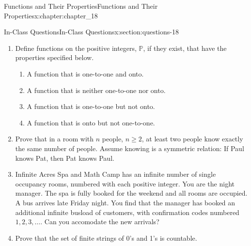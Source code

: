 \documentclass[oneside,10pt,]{book}
\numberwithin{equation}{section}
\begin{document}
\begin{chapterptx}{Functions and Their Properties}{}{Functions and Their Properties}{}{}{x:chapter:chapter_18}
\begin{sectionptx}{In-Class Questions}{}{In-Class Questions}{}{}{x:section:questions-18}
%
\begin{enumerate}[label=\arabic*.]
\item{}Define functions on the positive integers, \(\mathbb{P}\), if they exist, that have the properties specified below.%
\begin{enumerate}[label=(\alph*)]
\item{}A function that is one-to-one and onto.%
\item{}A function that is neither one-to-one nor onto.%
\item{}A function that is one-to-one but not onto.%
\item{}A function that is onto but not one-to-one.%
\end{enumerate}
%
\item{}Prove that in a room with \(n\) people, \(n \geq 2\), at least two people know exactly the same number of people. Assume knowing is a symmetric relation: If Paul knows Pat, then Pat knows Paul.%
\item{}Infinite Acres Spa and Math Camp has an infinite number of single occupancy rooms, numbered with each positive integer.  You are the night manager.  The spa is fully booked for the weekend and all rooms are occupied. A bus arrives late Friday night.  You find that the manager has booked an additional infinite busload of customers, with confirmation codes numbered \(1, 2, 3, \dots\).   Can you accomodate the new arrivals?%
\item{}Prove that the set of finite strings of 0's and 1's is countable.%
\end{enumerate}
%
\end{sectionptx}
\end{chapterptx}
%
%
\typeout{************************************************}
\typeout{************************************************}
%
\end{document}
